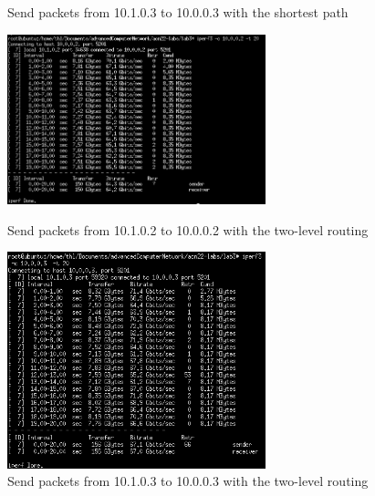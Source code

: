 \documentclass[a4paper,11pt]{article}
\begin{document}
\begin{itemize}
\begin{figure}[htbp]
\begin{minipage}[t]{0.49\textwidth}
    \caption{Send packets from 10.1.0.3 to 10.0.0.3 with the shortest path}
    \label{fig:e2sp}
    \end{minipage}
    \end{figure}
    \begin{figure}[htbp]
    \centering
    \begin{minipage}[t]{0.49\textwidth}
    \centering
    \includegraphics[width=7.5cm]{h002-h102-ft.png}
    \caption{Send packets from 10.1.0.2 to 10.0.0.2 with the two-level routing}
    \label{fig:e1ft}
    \end{minipage}
    \begin{minipage}[t]{0.49\textwidth}
    \centering
    \includegraphics[width=7.5cm]{h003-h103-ft.png}
    \caption{Send packets from 10.1.0.3 to 10.0.0.3 with the two-level routing}
    \label{fig:e2ft}
    \end{minipage}
    \end{figure}
\end{itemize}
\end{document}

